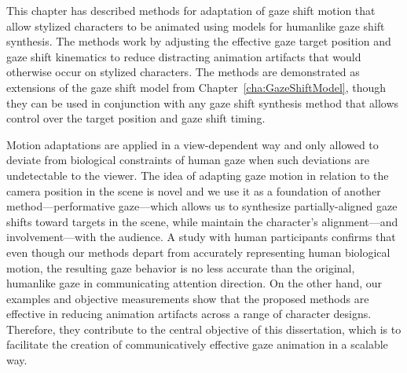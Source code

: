 This chapter has described methods for adaptation of gaze shift motion that allow stylized characters to be animated using models for humanlike gaze shift synthesis. The methods work by adjusting the effective gaze target position and gaze shift kinematics to reduce distracting animation artifacts that would otherwise occur on stylized characters. The methods are demonstrated as extensions of the gaze shift model from Chapter~\ref{cha:GazeShiftModel}, though they can be used in conjunction with any gaze shift synthesis method that allows control over the target position and gaze shift timing.

Motion adaptations are applied in a view-dependent way and only allowed to deviate from biological constraints of human gaze when such deviations are undetectable to the viewer. The idea of adapting gaze motion in relation to the camera position in the scene is novel and we use it as a foundation of another method---performative gaze---which allows us to synthesize partially-aligned gaze shifts toward targets in the scene, while maintain the character's alignment---and involvement---with the audience. A study with human participants confirms that even though our methods depart from accurately representing human biological motion, the resulting gaze behavior is no less accurate than the original, humanlike gaze in communicating attention direction. On the other hand, our examples and objective measurements show that the proposed methods are effective in reducing animation artifacts across a range of character designs. Therefore, they contribute to the central objective of this dissertation, which is to facilitate the creation of communicatively effective gaze animation in a scalable way.

